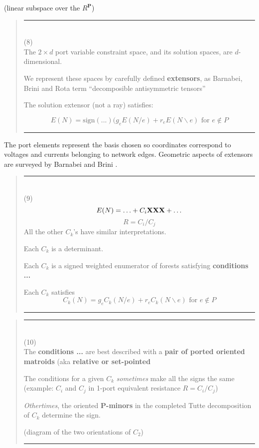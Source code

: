 \documentclass{article}
\begin{document}
(linear subspace over the $R^{\mathbf{P}}$)

\pagebreak[3] \begin{quote}\rule{\textwidth}{3pt}\\
(8)\\
The $2\times d$ port variable constraint space, 
and its solution spaces, are $d$-dimensional.

We represent these spaces by carefully defined
\textbf{extensors}, as Barnabei, Brini and Rota \cite{exteriorCalc}
term ``decomposible antisymmetric tensors''

The solution extensor (not a ray) satisfies:

\[
E(N) = \text{sign}(...)(g_e E(N/e) + r_e E(N\backslash e)
\text{\ for\ }e\not\in P
\]

\rule{\textwidth}{3pt}
\end{quote}

The port elements represent the basis chosen so coordinates correspond
to voltages and currents belonging to network edges.  Geometric aspects
of extensors are surveyed by 
Barnabei and Brini \cite{exteriorCalc}.

\pagebreak[3] \begin{quote}\rule{\textwidth}{3pt}\\
(9)\\
\[
E(N) = \ldots + C_i\mbox{\bf XXX} + \ldots
\]
\[
R = C_i/C_j
\]
All the other $C_k$'s have similar interpretations.

Each $C_k$ is a determinant.

Each $C_k$ is a signed weighted enumerator of
forests satisfying \textbf{conditions ...}

Each $C_k$ satisfies
\[
C_k(N) = g_e C_k(N/e) + r_e C_k(N\backslash e)
\text{\ for\ }e\not\in {P}
\]

\rule{\textwidth}{3pt}
\end{quote}


\pagebreak[3] \begin{quote}\rule{\textwidth}{3pt}\\
(10)\\
The \textbf{conditions ...} are best described with 
a \textbf{pair of ported oriented matroids}
(aka \textbf{relative or set-pointed}

The conditions for a given $C_k$ \textit{sometimes}
make all the signs the same (example: $C_i$ and 
$C_j$ in 1-port equivalent resistance $R=C_i/C_j$)

\textit{Othertimes}, the oriented \textbf{P-minors}
in the completed Tutte decomposition of $C_k$ determine
the sign.

(diagram of the two orientations of $C_2$)

\rule{\textwidth}{3pt}
\end{quote}
\end{document}
